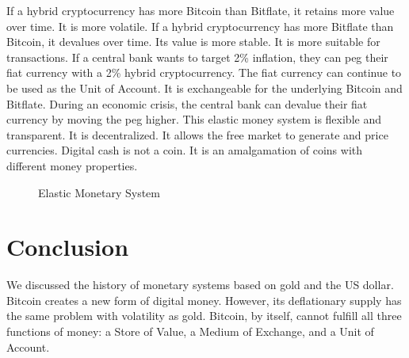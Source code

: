 \documentclass{article}      %
\begin{document}
If a hybrid cryptocurrency has more Bitcoin than Bitflate, it retains more value over time. It is more volatile. If a hybrid cryptocurrency has more Bitflate than Bitcoin, it devalues over time. Its value is more stable. It is more suitable for transactions. If a central bank wants to target 2\% inflation, they can peg their fiat currency with a 2\% hybrid cryptocurrency. The fiat currency can continue to be used as the Unit of Account. It is exchangeable for the underlying Bitcoin and Bitflate. During an economic crisis, the central bank can devalue their fiat currency by moving the peg higher. This elastic money system is flexible and transparent. It is decentralized. It allows the free market to generate and price currencies. Digital cash is not a coin. It is an amalgamation of coins with different money properties.

\begin{figure}
\centering
{}
\caption{Elastic Monetary System}
\end{figure}

\section{Conclusion}

We discussed the history of monetary systems based on gold and the US dollar. Bitcoin creates a new form of digital money. However, its deflationary supply has the same problem with volatility as gold. Bitcoin, by itself, cannot fulfill all three functions of money: a Store of Value, a Medium of Exchange, and a Unit of Account.
\end{document}
